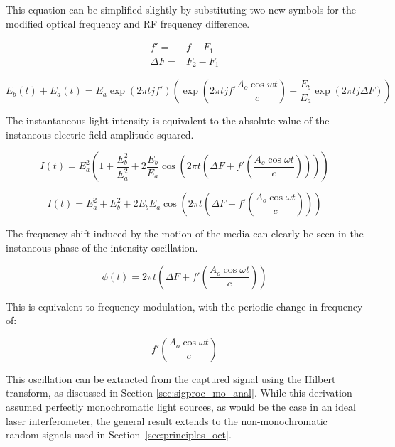 This equation can be simplified slightly by substituting two new symbols for the modified optical frequency and RF frequency difference.

\begin{align*}
f' = & f + F_1 \\
\Delta F = & F_2 - F_1
\end{align*}

\begin{dmath}
E_b(t) + E_a(t) = E_a \exp{(2 \pi t j f')}\left(\exp{\left(2 \pi t j f' \frac{ A_o \cos{wt}}{c}\right)} + \frac{E_b}{E_a} \exp{(2 \pi t j \Delta F)}\right)
\end{dmath}

The instantaneous light intensity is equivalent to the absolute value of the instaneous electric field amplitude squared.

\begin{dmath}
I(t) = E_a^2 \left(1 + \frac{E_b^2}{E_a^2} + 2 \frac{E_b}{E_a} \cos{\left(2 \pi t \left(\Delta F + f' \left( \frac{A_o \cos{\omega t}}{c} \right) \right)\right)} \right)
\end{dmath}

\begin{dmath}
I(t) = E_a^2 + E_b^2 + 2 E_b E_a \cos{\left(2 \pi t \left(\Delta F + f' \left( \frac{A_o \cos{\omega t}}{c} \right)  \right)\right)}
\end{dmath}

The frequency shift induced by the motion of the media can clearly be seen in the instaneous phase of the intensity oscillation.

\begin{dmath}
\label{eq:phase_aom_doppler}
\phi(t) = 2 \pi t \left(\Delta F + f' \left( \frac{A_o \cos{\omega t}}{c} \right)   \right)
\end{dmath}

This is equivalent to frequency modulation, with the periodic change in frequency of:

\begin{equation}
f' \left( \frac{A_o \cos{\omega t}}{c} \right)
\end{equation}

This oscillation can be extracted from the captured signal using the Hilbert transform, as discussed in Section \ref{sec:sigproc_mo_anal}. While this derivation assumed perfectly monochromatic light sources, as would be the case in an ideal laser interferometer, the general result extends to the non-monochromatic random signals used in Section~\ref{sec:principles_oct}.

